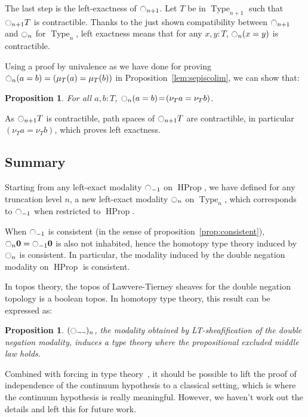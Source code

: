 \documentclass[preprint,9pt,numbers]{sigplanconf}
\newtheorem{prop}[thm]{Proposition}
\DeclareMathOperator{\Type}{Type}
\DeclareMathOperator{\HProp}{HProp}
\newcommand{\modal}{\ensuremath{\ocircle}}
\newcommand \zero {\mathbf{0}}
\begin{document}
The last step is the left-exactness of $\modal_{n+1}$. Let $T$ be in
$\Type_{n+1}$ such that $\modal_{n+1} T$ is contractible.  Thanks to the just
shown compatibility between $\modal_{n+1}$ and $\modal_n$ for
$\Type_n$, left exactness means that for any $x,y: T$,
$\modal_n(x=y)$ is contractible.

Using a proof by univalence as we have done for proving $\modal_n (a=b) = (\mu_T(a) =
\mu_T (b))$ in Proposition~\ref{lem:sepiscolim}, we can show that:
\begin{prop}
  For all $a,b:T$, $\modal_n(a=b) \!=\! (\nu_T a = \nu_T b)$.
\end{prop}

As $\modal_{n+1} T$ is contractible, path spaces of $\modal_{n+1} T$ are
contractible, in particular $(\nu_T a=\nu_T b)$, which proves left
exactness.

\subsection{Summary}
\label{ssec:summary}

Starting from any left-exact modality $\modal_{-1}$ on $\HProp$, we
have defined for any truncation level $n$, a new left-exact modality
$\modal_n$ on $\Type_n$, which corresponds to $\modal_{-1}$ when
restricted to $\HProp$.


When $\modal_{-1}$ is consistent (in the sense of
proposition~\ref{prop:consistent}), 
$\modal_{n}\zero=\modal_{-1}\zero$ is also not inhabited, hence the homotopy type theory induced by
$\modal_n$ is consistent. 
%
In particular, the modality induced by the double negation modality on
$\HProp$ is consistent.

In topos theory, the topos of Lawvere-Tierney sheaves for the double
negation topology is a boolean topos. In homotopy type theory, this
result can be expressed as:

\begin{prop}
  $(\modal_{\lnot\lnot})_n$, the modality obtained by LT-sheafification
  of the double negation modality,
  induces a type theory where the propositional excluded middle law holds.
\end{prop}

Combined with forcing in type theory~\cite{jaber2012extending}, it
should be possible to lift the proof of independence of the continuum
hypothesis to a classical setting, which is where the continuum hypothesis is
really meaningful.  However, we haven't work out the details and left
this for future work.
\end{document}
